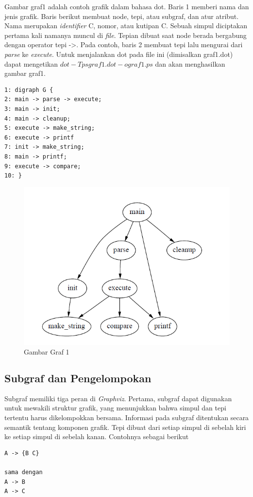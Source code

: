Gambar graf1 adalah contoh grafik dalam bahasa dot. Baris 1 memberi nama dan jenis grafik. Baris berikut membuat node, tepi, atau subgraf, dan atur atribut. Nama merupakan \textit{identifier} C, nomor, atau kutipan C. Sebuah simpul diciptakan pertama kali namanya muncul di \textit{file}. Tepian dibuat saat node berada bergabung dengan operator tepi ->. Pada contoh, baris 2 membuat tepi lalu mengurai dari \textit{parse} ke \textit{execute}. Untuk menjalankan dot pada file ini (dimisalkan graf1.dot) dapat mengetikan $ dot -Tps graf1.dot -o graf1.ps $ dan akan menghasilkan gambar graf1. 
\begin{lstlisting}
1: digraph G {
2: main -> parse -> execute;
3: main -> init;
4: main -> cleanup;
5: execute -> make_string;
6: execute -> printf
7: init -> make_string;
8: main -> printf;
9: execute -> compare;
10: }
\end{lstlisting}

\begin{figure}[H]
		\centering
		\includegraphics[scale = 0.5]{graph1.png}
		\caption{Gambar Graf 1}
		\label{}
\end{figure}	

\subsection{Subgraf dan Pengelompokan}
\label{sec: Subgraf dan Pengelompokan}
Subgraf memiliki tiga peran di \textit{Graphviz}. Pertama, subgraf dapat digunakan untuk mewakili struktur grafik, yang menunjukkan bahwa simpul dan tepi tertentu harus dikelompokkan bersama. Informasi pada subgraf ditentukan secara semantik tentang komponen grafik. Tepi dibuat dari setiap simpul di sebelah kiri ke setiap simpul di sebelah kanan. Contohnya sebagai berikut 
\begin{lstlisting}
A -> {B C} 

sama dengan
A -> B
A -> C
\end{lstlisting}


